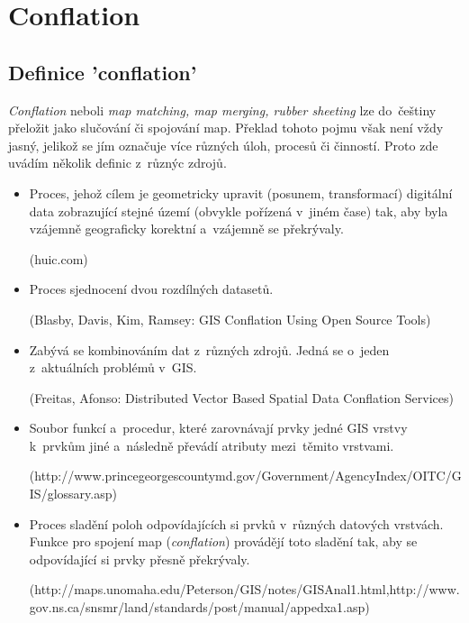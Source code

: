 \chapter{Conflation}
\label{2-conflation}

\section{Definice 'conflation'}
\label{definice}

\textit{Conflation} neboli \textit{map matching, map merging, rubber sheeting} lze do~češtiny přeložit jako slučování či spojování map. Překlad tohoto pojmu však není vždy 
jasný, jelikož se jím označuje více různých úloh, procesů či činností. Proto zde uvádím několik definic z~různýc zdrojů. 

\begin{itemize}[leftmargin=*]
 \item Proces, jehož cílem je geometricky upravit (posunem, transformací) digitální data zobrazující stejné území (obvykle pořízená v~jiném čase) tak, aby byla 
    vzájemně geograficky korektní a~vzájemně se překrývaly. %
    
    (huic.com)

  \item Proces sjednocení dvou rozdílných datasetů.
    
    (Blasby, Davis, Kim, Ramsey: GIS Conflation Using Open Source Tools)

  \item Zabývá se kombinováním dat z~různých zdrojů. Jedná se o~jeden z~aktuálních problémů v~GIS.
   
    (Freitas, Afonso: Distributed Vector Based Spatial Data Conflation Services)

  \item Soubor funkcí a~procedur, které zarovnávají prvky jedné GIS vrstvy k~prvkům jiné a~následně převádí atributy mezi~těmito vrstvami.
   
    (http://www.princegeorgescountymd.gov/Government/AgencyIndex/\newline OITC/GIS/glossary.asp)

  \item Proces sladění poloh odpovídajících si prvků v~různých datových vrstvách. Funkce pro spojení map (\textit{conflation}) provádějí toto sladění tak, aby se 
    odpovídající si prvky přesně překrývaly. 
    
    (http://maps.unomaha.edu/Peterson/GIS/notes/GISAnal1.html,\newline http://www.gov.ns.ca/snsmr/land/standards/post/manual/appedxa1.asp)


\end{itemize}
